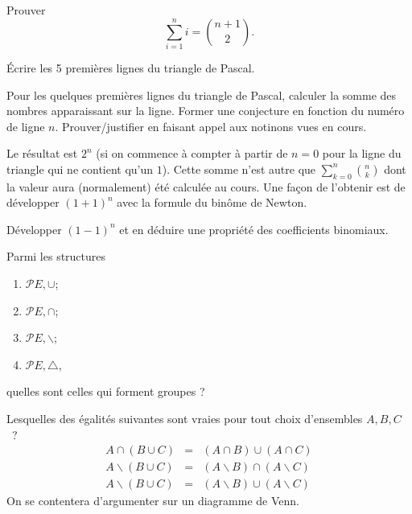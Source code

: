 \documentclass[12pt,french,oneside,a4paper]{memoir} %
\begin{document}
\begin{exo}
  Prouver
  \begin{equation*}
    \sum_{i=1}^n i=\binom{n+1}{2}.
  \end{equation*}
\end{exo}

\begin{exo}
  Écrire les 5 premières lignes du triangle de Pascal.
\end{exo}

\begin{exo}
  Pour les quelques premières lignes du triangle de Pascal, calculer la somme des nombres apparaissant sur la ligne. Former une conjecture en fonction du numéro de ligne $n$. Prouver/justifier en faisant appel aux notinons vues en cours.
\begin{correction}
Le résultat est $2^{n}$ (si on commence à compter à partir de $n = 0$ pour la ligne du triangle qui ne contient qu'un $1$). Cette somme n'est autre que \(\sum_{k=0}^{n} \binom{n}{k}\) dont la valeur aura (normalement) été calculée au cours. Une façon de l'obtenir est de développer \((1+1)^n\) avec la formule du binôme de Newton.
\end{correction}
\end{exo}


\begin{exo}
  Développer $(1-1)^n$ et en déduire une propriété des coefficients binomiaux.
\end{exo}

\begin{exo}
  Parmi les structures
  \begin{enumerate}
  \item $\mathcal{P} E, \cup$;
  \item $\mathcal{P}E, \cap$;
  \item $\mathcal{P} E, \backslash$;
  \item $\mathcal{P} E, \bigtriangleup$,
  \end{enumerate}
  quelles sont celles qui forment groupes ?
\end{exo}

\begin{exo}
  Lesquelles des égalités suivantes sont vraies pour tout choix d'ensembles $A,B,C$~?
  \begin{equation*}
    \begin{array}{rcl}
      A \cap (B \cup C) &= &(A \cap B) \cup (A \cap C) \\
      A \backslash (B \cup C) &= &(A \backslash B) \cap (A \backslash C) \\
      A \backslash (B \cup C) &= &(A \backslash B) \cup (A \backslash C) 
    \end{array}
  \end{equation*}
  On se contentera d'argumenter sur un diagramme de Venn.
\end{exo}
\end{document}
